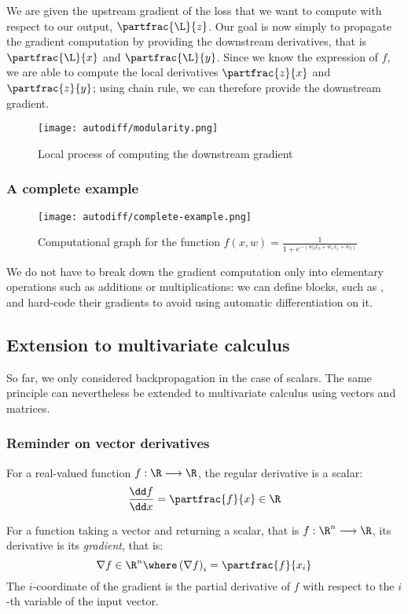 We are given the upstream gradient of the loss that we want to compute with respect to our output, $\partfrac{\L}{z}$. Our goal is now simply to propagate the gradient computation by providing the downstream derivatives, that is $\partfrac{\L}{x}$ and $\partfrac{\L}{y}$. Since we know the expression of $f$, we are able to compute the local derivatives $\partfrac{z}{x}$ and $\partfrac{z}{y}$; using chain rule, we can therefore provide the downstream gradient.
\begin{figure}[H]
    \centering
    \texttt{[image: autodiff/modularity.png]}
    \caption{Local process of computing the downstream gradient}
\end{figure}

\subsubsection{A complete example}
\begin{figure}[H]
    \centering
    \texttt{[image: autodiff/complete-example.png]}
    \caption{Computational graph for the function $f(x, w) = \frac{1}{1+e^{-(w_0x_0+w_1x_1+w_2)}}$}
\end{figure}
We do not have to break down the gradient computation only into elementary operations such as additions or multiplications: we can define blocks, such as , and hard-code their gradients to avoid using automatic differentiation on it.

\subsection{Extension to multivariate calculus}
So far, we only considered backpropagation in the case of scalars. The same principle can nevertheless be extended to multivariate calculus using vectors and matrices.

\subsubsection{Reminder on vector derivatives}
For a real-valued function $f:\R\longrightarrow\R$, the regular derivative is a scalar:
\begin{equation*}
    \frac{\dd f}{\dd x} = \partfrac{f}{x} \in \R
\end{equation*}

For a function taking a vector and returning a scalar, that is $f:\R^n\longrightarrow\R$, its derivative is its \emph{gradient}, that is:
\begin{equation*}
    \nabla f\in\R^n \where \left(\nabla f\right)_i = \partfrac{f}{x_i}
\end{equation*}
The $i$-coordinate of the gradient is the partial derivative of $f$ with respect to the $i$-th variable of the input vector.

